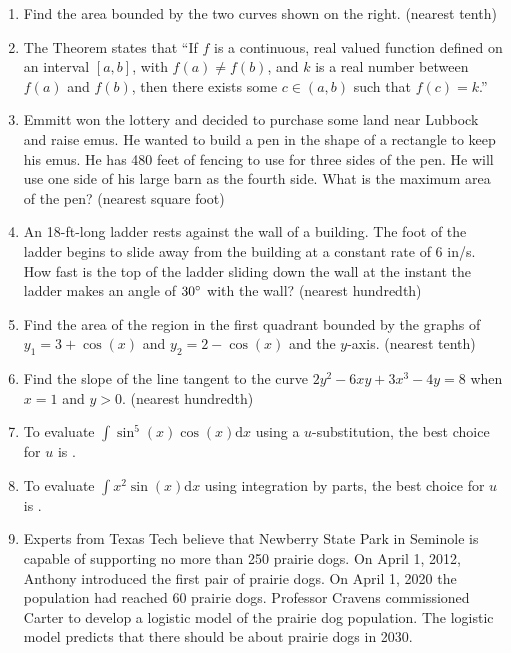 \documentclass[../uilmath.tex]{subfiles}
\begin{document}
\begin{enumerate}[label=\bfseries\arabic*.]
    \item %
    Find the area bounded by the two curves shown on the right. (nearest tenth)

    \item %
    The \blank Theorem states that ``If $f$ is a continuous, real valued function defined on an interval $[a,b]$, 
    with $f(a)\neq f(b)$, and $k$ is a real number between $f(a)$ and $f(b)$, then there exists some $c\in (a,b)$ such that $f(c)=k$.''

    \item %
    Emmitt won the lottery and decided to purchase some land near Lubbock and raise emus. He wanted to build a pen in the 
    shape of a rectangle to keep his emus. He has 480 feet of fencing to use for three sides of the pen. He will use one side of 
    his large barn as the fourth side. What is the maximum area of the pen? (nearest square foot)

    \item %
    An 18-ft-long ladder rests against the wall of a building. The foot of the ladder begins to slide away from the building at a constant rate of 6 in/s. How fast is the 
    top of the ladder sliding down the wall at the instant the ladder makes an angle of $30\degree$ with the wall? (nearest hundredth)

    \item %
    Find the area of the region in the first quadrant bounded by the graphs of $y_1=3+\cos(x)$ and $y_2=2-\cos(x)$ and the $y$-axis. (nearest tenth)

    \item %
    Find the slope of the line tangent to the curve $2y^2-6xy+3x^3-4y=8$ when $x=1$ and $y>0$. (nearest hundredth)

    \item %
    To evaluate $\int \sin^5(x)\cos(x)\mathrm{d}x$ using a $u$-substitution, the best choice for $u$ is \blank.

    \item %
    To evaluate $\int x^2\sin(x)\mathrm{d}x$ using integration by parts, the best choice for $u$ is \blank.

    \item %
    Experts from Texas Tech believe that Newberry State Park in Seminole is capable of supporting no more than 250 prairie dogs.
    On April 1, 2012, Anthony introduced the first pair of prairie dogs. On April 1, 2020 the population had reached 60 prairie dogs.
    Professor Cravens commissioned Carter to develop a logistic model of the prairie dog population. The logistic model predicts that there should be 
    about \blank prairie dogs in 2030.



\end{enumerate}
\end{document}

